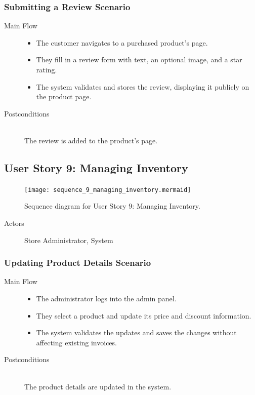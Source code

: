 \documentclass[twoside,a4paper,journal]{IEEEtran}
\begin{document}
\subsubsection{Submitting a Review Scenario}
\begin{description}
  \item[Main Flow] \hfill
    \begin{itemize}
      \item The customer navigates to a purchased product's page.
      \item They fill in a review form with text, an optional image, and a star
        rating.
      \item The system validates and stores the review, displaying it publicly
        on the product page.
    \end{itemize}
  \item[Postconditions] \hfill \\
    The review is added to the product's page.
\end{description}

\subsection{User Story 9: Managing Inventory}
\begin{figure}[!t]
\centering
\texttt{[image: sequence\_9\_managing\_inventory.mermaid]}
\caption{Sequence diagram for User Story 9: Managing Inventory.}
\label{fig:sequence_9}
\end{figure}
\begin{description}
  \item[Actors] Store Administrator, System
\end{description}
\subsubsection{Updating Product Details Scenario}
\begin{description}
  \item[Main Flow] \hfill
    \begin{itemize}
      \item The administrator logs into the admin panel.
      \item They select a product and update its price and discount information.
      \item The system validates the updates and saves the changes without
        affecting existing invoices.
    \end{itemize}
  \item[Postconditions] \hfill \\ The product details are updated in the system.
\end{description}
\end{document}
